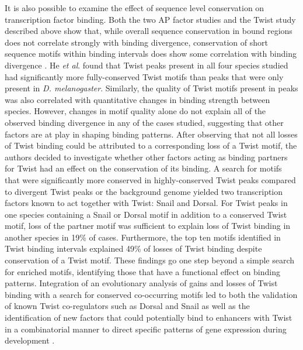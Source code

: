 It is also possible to examine the effect of sequence level conservation on transcription factor binding. Both the two AP factor studies and the Twist study described above show that, while overall sequence conservation in bound regions does not correlate strongly with binding divergence, conservation of short sequence motifs within binding intervals does show some correlation with binding divergence \citep{bradley_binding_2010,he_high_2011,paris_extensive_2013}. He \emph{et al}. found that Twist peaks present in all four species studied had significantly more fully-conserved Twist motifs than peaks that were only present in \emph{D. melanogaster}. Similarly, the quality of Twist motifs present in peaks was also correlated with quantitative changes in binding strength between species. However, changes in motif quality alone do not explain all of the observed binding divergence in any of the cases studied, suggesting that other factors are at play in shaping binding patterns. After observing that not all losses of Twist binding could be attributed to a corresponding loss of a Twist motif, the authors decided to investigate whether other factors acting as binding partners for Twist had an effect on the conservation of its binding. A search for motifs that were significantly more conserved in highly-conserved Twist peaks compared to divergent Twist peaks or the background genome yielded two transcription factors known to act together with Twist: Snail and Dorsal. For Twist peaks in one species containing a Snail or Dorsal motif in addition to a conserved Twist motif, loss of the partner motif was sufficient to explain loss of Twist binding in another species in 19\% of cases. Furthermore, the top ten motifs identified in Twist binding intervals explained 49\% of losses of Twist binding despite conservation of a Twist motif. These findings go one step beyond a simple search for enriched motifs, identifying those that have a functional effect on binding patterns. Integration of an evolutionary analysis of gains and losses of Twist binding with a search for conserved co-occurring motifs led to both the validation of known Twist co-regulators such as Dorsal and Snail as well as the identification of new factors that could potentially bind to enhancers with Twist in a combinatorial manner to direct specific patterns of gene expression during development \citep{he_high_2011}.\\

